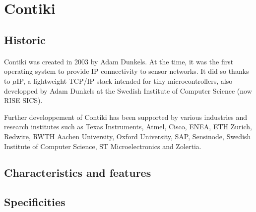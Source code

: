 \section{Contiki}

\subsection{Historic}
\paragraph{}
Contiki was created in 2003 by Adam Dunkels. %
At the time, it was the first operating system to provide IP connectivity to sensor networks.
It did so thanks to $\mu$IP, a lightweight TCP/IP stack intended for tiny microcontrollers,
    also developped by Adam Dunkels at the Swedish Institute of Computer Science (now RISE SICS).%

Further developpement of Contiki has been supported by various industries and research institutes 
    such as Texas Instruments, Atmel, Cisco, ENEA, ETH Zurich, Redwire, RWTH Aachen University, 
    Oxford University, SAP, Sensinode, Swedish Institute of Computer Science, ST Microelectronics and Zolertia.

\subsection{Characteristics and features}
\paragraph{}



\subsection{Specificities}
\paragraph{}
